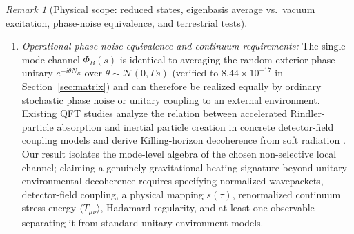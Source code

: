 \documentclass[11pt,a4paper]{article}
\theoremstyle{definition}
\theoremstyle{remark}
\newtheorem{remark}{Remark}
\newcommand{\1}{\mathbf{1}}
\begin{document}
\begin{remark}[Physical scope: reduced states, eigenbasis average vs.\ vacuum excitation, phase-noise equivalence, and terrestrial tests]
\begin{enumerate}
  \item \emph{Operational phase-noise equivalence and continuum requirements:} The single-mode channel $\Phi_B(s)$ is identical to averaging the random exterior phase unitary $e^{-i\theta N_R}$ over $\theta\sim\mathcal{N}(0,\Gamma s)$ (verified to $8.44\times 10^{-17}$ in Section~\ref{sec:matrix}) and can therefore be realized equally by ordinary stochastic phase noise or unitary coupling to an external environment. Existing QFT studies analyze the relation between accelerated Rindler-particle absorption and inertial particle creation in concrete detector-field coupling models \cite{UnruhWald1984} and derive Killing-horizon decoherence from soft radiation \cite{DSW2023}. Our result isolates the mode-level algebra of the chosen non-selective local channel; claiming a genuinely gravitational heating signature beyond unitary environmental decoherence requires specifying normalized wavepackets, detector-field coupling, a physical mapping $s(\tau)$, renormalized continuum stress-energy $\langle T_{\mu\nu}\rangle$, Hadamard regularity, and at least one observable separating it from standard unitary environment models.

\end{enumerate}
\end{remark}
\end{document}
